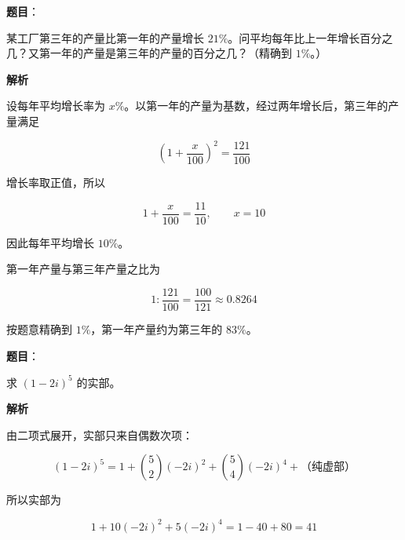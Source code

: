 


\begin{answer}

\textbf{题目}：

某工厂第三年的产量比第一年的产量增长 $21\%$。问平均每年比上一年增长百分之几？又第一年的产量是第三年的产量的百分之几？（精确到 $1\%$。）

\textbf{解析}

设每年平均增长率为 $x\%$。以第一年的产量为基数，经过两年增长后，第三年的产量满足

\nopagebreak[4]
\[
\left(1+\frac{x}{100}\right)^2=\frac{121}{100}
\]

增长率取正值，所以

\nopagebreak[4]
\[
1+\frac{x}{100}=\frac{11}{10},
\qquad x=10
\]

因此每年平均增长 $10\%$。

第一年产量与第三年产量之比为

\nopagebreak[4]
\[
1\mathbin{:}\frac{121}{100}=\frac{100}{121}\approx0.8264
\]

按题意精确到 $1\%$，第一年产量约为第三年的 $83\%$。


\end{answer}
\begin{answer}

\textbf{题目}：

求 $(1-2i)^5$ 的实部。

\textbf{解析}

由二项式展开，实部只来自偶数次项：

\nopagebreak[4]
\[
(1-2i)^5
=1+\binom52(-2i)^2+\binom54(-2i)^4+\text{（纯虚部）}
\]

所以实部为

\nopagebreak[4]
\[
1+10(-2i)^2+5(-2i)^4
=1-40+80=41
\]


\end{answer}
